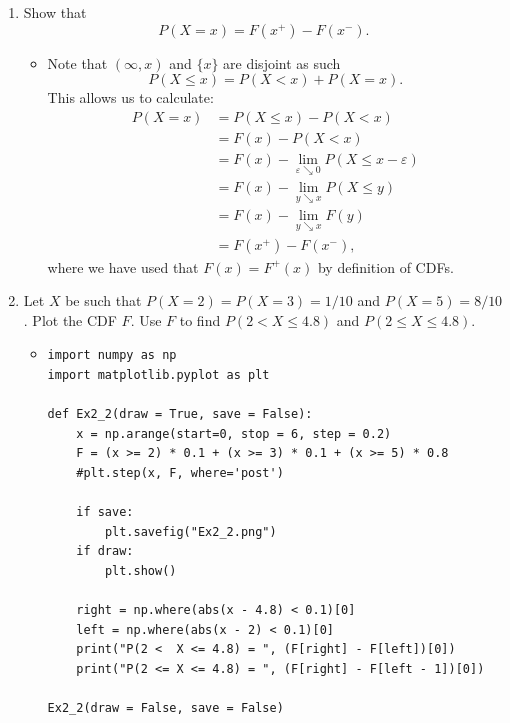 \documentclass{article}
\begin{document}
\begin{enumerate}
	\item Show that
	$$
	P(X = x) = F(x^+) - F(x^-).
	$$
		\begin{itemize}
			\item Note that $(\infty, x)$ and $\{x\}$ are disjoint as such
			$$
			P(X \leq x) = P(X < x) + P(X = x).
			$$
			This allows us to calculate:
			$$
			\begin{aligned}
			P(X = x) &= P(X \leq x) - P(X < x) \\
			&= F(x) - P(X < x) \\
			&= F(x) - \lim_{\varepsilon \searrow 0} P(X \leq x - \varepsilon) \\
			&= F(x) - \lim_{y \searrow x} P(X \leq y) \\
			&= F(x) - \lim_{y \searrow x} F(y) \\
			&= F(x^+) - F(x^-),
			\end{aligned}
			$$
			where we have used that $F(x) = F^+(x)$ by definition of CDFs.
		\end{itemize}
	\item Let $X$ be such that $P(X = 2) = P(X = 3) = 1 / 10$ and $P(X = 5) = 8 / 10$. Plot the CDF $F$. Use $F$ to find $P(2 < X \leq 4.8)$ and $P(2 \leq X \leq 4.8)$.
		\begin{itemize}
			\item
			\begin{verbatim}
import numpy as np
import matplotlib.pyplot as plt

def Ex2_2(draw = True, save = False):
    x = np.arange(start=0, stop = 6, step = 0.2)
    F = (x >= 2) * 0.1 + (x >= 3) * 0.1 + (x >= 5) * 0.8
    #plt.step(x, F, where='post')

    if save:
        plt.savefig("Ex2_2.png")
    if draw:
        plt.show()

    right = np.where(abs(x - 4.8) < 0.1)[0]
    left = np.where(abs(x - 2) < 0.1)[0]
    print("P(2 <  X <= 4.8) = ", (F[right] - F[left])[0])
    print("P(2 <= X <= 4.8) = ", (F[right] - F[left - 1])[0])

Ex2_2(draw = False, save = False)


\end{verbatim}
\end{itemize}
\end{enumerate}
\end{document}

